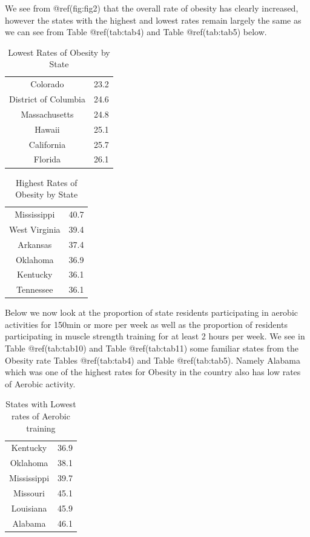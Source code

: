 \documentclass[
]{article}
\begin{document}
We see from @ref(fig:fig2) that the overall rate of obesity has clearly
increased, however the states with the highest and lowest rates remain
largely the same as we can see from Table @ref(tab:tab4) and Table
@ref(tab:tab5) below.

\begin{table}[H]

\caption{\label{tab:tab4}Lowest Rates of Obesity by State}
\centering
\begin{tabular}[t]{cc}
\toprule
Colorado & 23.2\\
District of Columbia & 24.6\\
Massachusetts & 24.8\\
Hawaii & 25.1\\
California & 25.7\\
\addlinespace
Florida & 26.1\\
\bottomrule
\end{tabular}
\end{table}

\begin{table}[H]

\caption{\label{tab:tab5}Highest Rates of Obesity by State}
\centering
\begin{tabular}[t]{cc}
\toprule
Mississippi & 40.7\\
West Virginia & 39.4\\
Arkansas & 37.4\\
Oklahoma & 36.9\\
Kentucky & 36.1\\
\addlinespace
Tennessee & 36.1\\
\bottomrule
\end{tabular}
\end{table}

Below we now look at the proportion of state residents participating in
aerobic activities for 150min or more per week as well as the proportion
of residents participating in muscle strength training for at least 2
hours per week. We see in Table @ref(tab:tab10) and Table
@ref(tab:tab11) some familiar states from the Obesity rate Tables
@ref(tab:tab4) and Table @ref(tab:tab5). Namely Alabama which was one of
the highest rates for Obesity in the country also has low rates of
Aerobic activity.

\begin{table}[H]

\caption{\label{tab:tab10}States with Lowest rates of Aerobic training}
\centering
\begin{tabular}[t]{cc}
\toprule
Kentucky & 36.9\\
Oklahoma & 38.1\\
Mississippi & 39.7\\
Missouri & 45.1\\
Louisiana & 45.9\\
\addlinespace
Alabama & 46.1\\
\bottomrule
\end{tabular}
\end{table}
\end{document}

